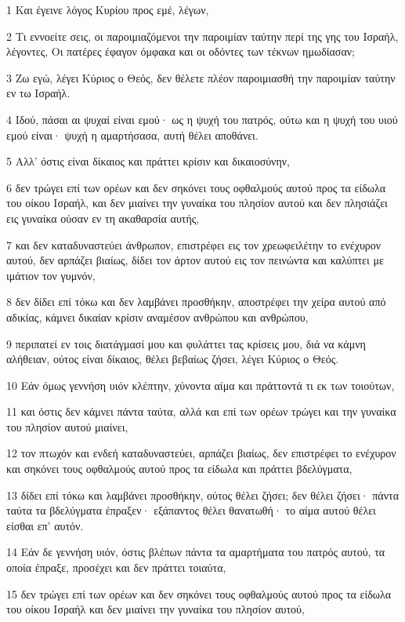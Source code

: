 \par 1 Και έγεινε λόγος Κυρίου προς εμέ, λέγων,
\par 2 Τι εννοείτε σεις, οι παροιμιαζόμενοι την παροιμίαν ταύτην περί της γης του Ισραήλ, λέγοντες, Οι πατέρες έφαγον όμφακα και οι οδόντες των τέκνων ημωδίασαν;
\par 3 Ζω εγώ, λέγει Κύριος ο Θεός, δεν θέλετε πλέον παροιμιασθή την παροιμίαν ταύτην εν τω Ισραήλ.
\par 4 Ιδού, πάσαι αι ψυχαί είναι εμού· ως η ψυχή του πατρός, ούτω και η ψυχή του υιού εμού είναι· ψυχή η αμαρτήσασα, αυτή θέλει αποθάνει.
\par 5 Αλλ' όστις είναι δίκαιος και πράττει κρίσιν και δικαιοσύνην,
\par 6 δεν τρώγει επί των ορέων και δεν σηκόνει τους οφθαλμούς αυτού προς τα είδωλα του οίκου Ισραήλ, και δεν μιαίνει την γυναίκα του πλησίον αυτού και δεν πλησιάζει εις γυναίκα ούσαν εν τη ακαθαρσία αυτής,
\par 7 και δεν καταδυναστεύει άνθρωπον, επιστρέφει εις τον χρεωφειλέτην το ενέχυρον αυτού, δεν αρπάζει βιαίως, δίδει τον άρτον αυτού εις τον πεινώντα και καλύπτει με ιμάτιον τον γυμνόν,
\par 8 δεν δίδει επί τόκω και δεν λαμβάνει προσθήκην, αποστρέφει την χείρα αυτού από αδικίας, κάμνει δικαίαν κρίσιν αναμέσον ανθρώπου και ανθρώπου,
\par 9 περιπατεί εν τοις διατάγμασί μου και φυλάττει τας κρίσεις μου, διά να κάμνη αλήθειαν, ούτος είναι δίκαιος, θέλει βεβαίως ζήσει, λέγει Κύριος ο Θεός.
\par 10 Εάν όμως γεννήση υιόν κλέπτην, χύνοντα αίμα και πράττοντά τι εκ των τοιούτων,
\par 11 και όστις δεν κάμνει πάντα ταύτα, αλλά και επί των ορέων τρώγει και την γυναίκα του πλησίον αυτού μιαίνει,
\par 12 τον πτωχόν και ενδεή καταδυναστεύει, αρπάζει βιαίως, δεν επιστρέφει το ενέχυρον και σηκόνει τους οφθαλμούς αυτού προς τα είδωλα και πράττει βδελύγματα,
\par 13 δίδει επί τόκω και λαμβάνει προσθήκην, ούτος θέλει ζήσει; δεν θέλει ζήσει· πάντα ταύτα τα βδελύγματα έπραξεν· εξάπαντος θέλει θανατωθή· το αίμα αυτού θέλει είσθαι επ' αυτόν.
\par 14 Εάν δε γεννήση υιόν, όστις βλέπων πάντα τα αμαρτήματα του πατρός αυτού, τα οποία έπραξε, προσέχει και δεν πράττει τοιαύτα,
\par 15 δεν τρώγει επί των ορέων και δεν σηκόνει τους οφθαλμούς αυτού προς τα είδωλα του οίκου Ισραήλ και δεν μιαίνει την γυναίκα του πλησίον αυτού,
